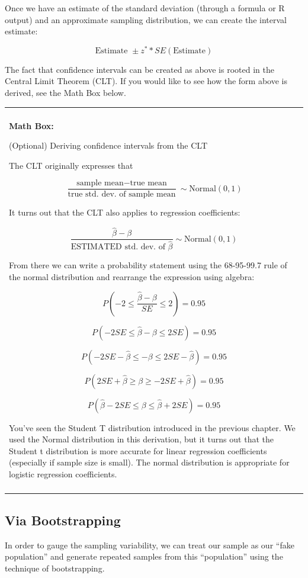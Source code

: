 \documentclass[]{book}
\newenvironment{mathbox}
{
    \begin{center}
    
    \begin{tabular}{|p{0.8\textwidth}|}
    \rowcolor{LightYellow}
    \hline\\
    \rowcolor{LightYellow}
    \textbf{Math Box:}
}
{
    \\\rowcolor{LightYellow}
    \\\hline
    \end{tabular} 
    \end{center}
}
\begin{document}
Once we have an estimate of the standard deviation (through a formula or R output) and an approximate sampling distribution, we can create the interval estimate:

\[\text{Estimate }\pm z^* *SE(\text{Estimate})\]

The fact that confidence intervals can be created as above is rooted in the Central Limit Theorem (CLT). If you would like to see how the form above is derived, see the Math Box below.

\begin{mathbox}
(Optional) Deriving confidence intervals from the CLT

The CLT originally expresses that

\[\frac{\text{sample mean} - \text{true mean}}{\text{true std. dev. of sample mean}} \sim \text{Normal}(0,1)\]

It turns out that the CLT also applies to regression coefficients:

\[\frac{\hat{\beta} - \beta}{\text{ESTIMATED std. dev. of }\hat{\beta}} \sim \text{Normal}(0,1)\]

From there we can write a probability statement using the 68-95-99.7
rule of the normal distribution and rearrange the expression using
algebra:

\[P(-2\leq\frac{\hat{\beta} - \beta}{SE}\leq2) = 0.95\]

\[P(-2 SE\leq\hat{\beta} - \beta \leq2 SE ) = 0.95\]

\[P(-2 SE-\hat{\beta} \leq  -\beta \leq2 SE-\hat{\beta} ) = 0.95\]

\[P(2 SE+\hat{\beta} \geq \beta \geq -2 SE+\hat{\beta} ) = 0.95\]

\[P(\hat{\beta}-2 SE \leq \beta \leq\hat{\beta}+2 SE ) = 0.95\]

You've seen the Student T distribution introduced in the previous
chapter. We used the Normal distribution in this derivation, but it
turns out that the Student t distribution is more accurate for linear
regression coefficients (especially if sample size is small). The normal
distribution is appropriate for logistic regression coefficients.
\end{mathbox}

\hypertarget{via-bootstrapping}{%
\subsection{Via Bootstrapping}\label{via-bootstrapping}}

In order to gauge the sampling variability, we can treat our sample as our ``fake population'' and generate repeated samples from this ``population'' using the technique of bootstrapping.
\end{document}
